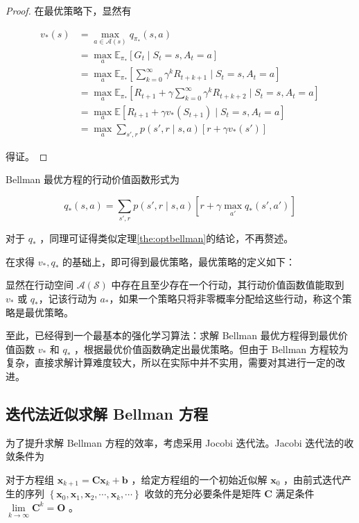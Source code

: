 \begin{proof}
    在最优策略下，显然有

     \[
    \begin{aligned}v_*(s) &= \max_{a\in \mathcal A(s)}q_{\pi_*}(s,a) \\ &=\max_a \mathbb{E}_{\pi_*} \left[G_t \mid S_t=s, A_t=a \right] \\ &= \max_a \mathbb{E}_{\pi_*} \left[\sum_{k=0}^\infty \gamma^kR_{t+k+1} \mid S_t=s,A_t=a \right] \\ &= \max_a \mathbb{E}_{\pi_*} \left[R_{t+1}+\gamma \sum_{k=0}^\infty\gamma^kR_{t+k+2}\mid S_t=s,A_t=a \right] \\ &= \max_a \mathbb{E}[R_{t+1}+\gamma v_*(S_{t+1}) \mid S_t=s,A_t=a] \\ &=\max_{a}\sum_{s',r}p(s',r \mid s,a)[r+\gamma v_*(s')]\end{aligned}
    \]

    得证。
\end{proof}

Bellman 最优方程的行动价值函数形式为

\begin{equation}
    q_*(s,a) = \sum_{s',r}p(s',r \mid s,a)\left[r+\gamma \max_{a'}q_*(s',a') \right]
\end{equation}

对于 $q_*$ ，同理可证得类似定理\ref{the:optbellman}的结论，不再赘述。

在求得 $v_*,q_*$ 的基础上，即可得到{\jiacu 最优策略}，最优策略的定义如下：

\begin{Definition}
    显然在行动空间 $\mathcal{A}(\mathcal{S})$ 中存在且至少存在一个行动，其行动价值函数值能取到 $v_*$ 或 $q_*$，记该行动为 $a_*$，如果一个策略只将非零概率分配给这些行动，称这个策略是最优策略。
\end{Definition}

至此，已经得到一个最基本的强化学习算法：求解 Bellman 最优方程得到最优价值函数 $v_*$ 和 $q_*$ ，根据最优价值函数确定出最优策略。但由于 Bellman 方程较为复杂，直接求解计算难度较大，所以在实际中并不实用，需要对其进行一定的改进。

\subsection{迭代法近似求解 Bellman 方程}

为了提升求解 Bellman 方程的效率，考虑采用 Jocobi 迭代法\cite{2007numanalysis}。Jacobi 迭代法的收敛条件为

\begin{Theorem}\label{the:jacobi}
    对于方程组 $\boldsymbol{x}_{k+1} = \boldsymbol{Cx}_{k}+\boldsymbol{b}$ ，给定方程组的一个初始近似解 $\boldsymbol{x}_0$ ，由前式迭代产生的序列 $\left\{\boldsymbol{x}_0,\boldsymbol{x}_1,\boldsymbol{x}_2,\cdots,\boldsymbol{x}_k,\cdots\right\}$ 收敛的充分必要条件是矩阵 $\boldsymbol{C}$ 满足条件 $\lim\limits_{k \rightarrow \infty} \boldsymbol{C}^{k}=\boldsymbol{O}$ 。
\end{Theorem}

